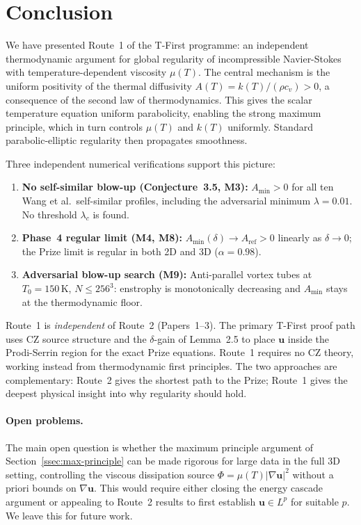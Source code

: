 \documentclass[12pt]{article}
\newcommand{\abs}[1]{\left|#1\right|}
\newcommand{\grad}{\nabla}
\newcommand{\Amin}{A_{\min}}
\begin{document}
\section{Conclusion}
\label{sec:conclusion}

We have presented Route~1 of the T-First programme: an independent thermodynamic
argument for global regularity of incompressible Navier-Stokes with
temperature-dependent viscosity $\mu(T)$.  The central mechanism is the uniform
positivity of the thermal diffusivity $A(T) = k(T)/(\rho c_v) > 0$, a consequence
of the second law of thermodynamics.  This gives the scalar temperature equation
uniform parabolicity, enabling the strong maximum principle, which in turn controls
$\mu(T)$ and $k(T)$ uniformly.  Standard parabolic-elliptic regularity then
propagates smoothness.

Three independent numerical verifications support this picture:
\begin{enumerate}[leftmargin=2em]
  \item \textbf{No self-similar blow-up (Conjecture~3.5, M3):} $\Amin > 0$
    for all ten Wang et al.\ self-similar profiles, including the adversarial
    minimum $\lambda = 0.01$.  No threshold $\lambda_c$ is found.
  \item \textbf{Phase~4 regular limit (M4, M8):} $A_{\min}(\delta) \to
    A_{\mathrm{ref}} > 0$ linearly as $\delta\to 0$; the Prize limit is regular in
    both 2D and 3D ($\alpha = 0.98$).
  \item \textbf{Adversarial blow-up search (M9):} Anti-parallel vortex tubes at
    $T_0 = 150\,\mathrm{K}$, $N \leq 256^3$: enstrophy is monotonically decreasing
    and $\Amin$ stays at the thermodynamic floor.
\end{enumerate}

Route~1 is \emph{independent} of Route~2 (Papers~1--3).  The primary T-First proof
path uses CZ source structure and the $\delta$-gain of Lemma~2.5 to place $\mathbf{u}$
inside the Prodi-Serrin region for the exact Prize equations.  Route~1 requires no
CZ theory, working instead from thermodynamic first principles.  The two approaches
are complementary: Route~2 gives the shortest path to the Prize; Route~1 gives
the deepest physical insight into why regularity should hold.

\paragraph{Open problems.}
The main open question is whether the maximum principle argument of
Section~\ref{ssec:max-principle} can be made rigorous for large data in the full
3D setting, controlling the viscous dissipation source $\Phi = \mu(T)\abs{\grad\mathbf{u}}^2$
without a priori bounds on $\grad\mathbf{u}$.  This would require either closing
the energy cascade argument or appealing to Route~2 results to first establish
$\mathbf{u}\in L^p$ for suitable $p$.  We leave this for future work.
\end{document}

